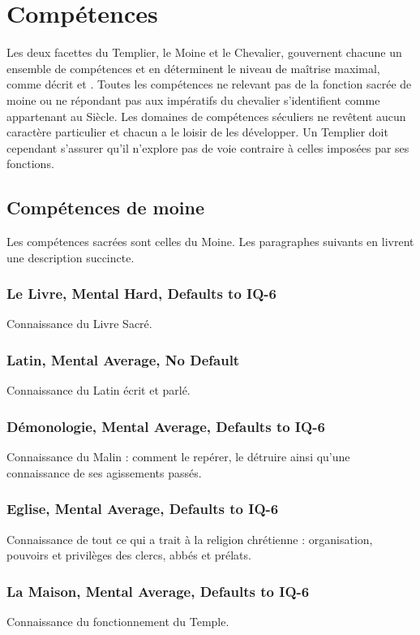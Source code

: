 \section{Compétences}\label{sec:competences}
Les deux facettes du Templier, le Moine et le Chevalier, gouvernent chacune
un ensemble de compétences et en déterminent le niveau de maîtrise maximal,
comme décrit  et .
Toutes les compétences ne relevant pas de la fonction sacrée de moine ou ne
répondant pas aux impératifs du chevalier s'identifient comme appartenant
au Siècle. Les domaines de compétences séculiers ne revêtent aucun
caractère particulier et chacun a le loisir de les développer. Un Templier
doit cependant s'assurer qu'il n'explore pas de voie contraire à celles
imposées par ses fonctions.
    
    \subsection{Compétences de moine}\label{subsec:comp-moine}
    Les compétences sacrées sont celles du Moine. Les paragraphes suivants en
    livrent une description succincte.
    \subsubsection*{Le Livre, Mental Hard, Defaults to IQ-6}
    Connaissance du Livre Sacré.
    \subsubsection*{Latin, Mental Average, No Default}
    Connaissance du Latin écrit et parlé.
    \subsubsection*{Démonologie, Mental Average, Defaults to IQ-6}
    Connaissance du Malin : comment le repérer, le détruire ainsi qu'une
    connaissance de ses agissements passés.
    \subsubsection*{Eglise, Mental Average, Defaults to IQ-6}
    Connaissance de tout ce qui a trait à la religion chrétienne :
    organisation, pouvoirs et privilèges des clercs, abbés et prélats.
    \subsubsection*{La Maison, Mental Average, Defaults to IQ-6}
    Connaissance du fonctionnement du Temple.
